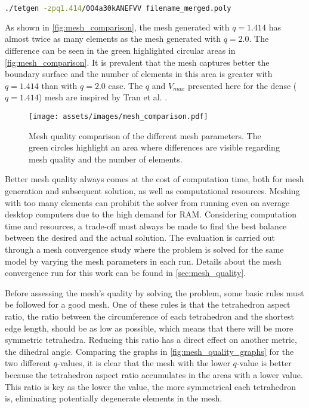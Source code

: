 \begin{lstlisting}[language=bash,caption={Command to run TetGen},captionpos=b, label=lst:tetgen_commands]
	./tetgen -zpq1.414/0O4a30kANEFVV filename_merged.poly
\end{lstlisting}

As shown in \autoref{fig:mesh_comparison}, the mesh generated with $q = 1.414$ has almost twice as many elements as the mesh generated with $q = 2.0$. The difference can be seen in the green highlighted circular areas in \autoref{fig:mesh_comparison}. It is prevalent that the mesh captures better the boundary surface and the number of elements in this area is greater with $q = 1.414$ than with $q = 2.0$ case. The $q$ and $V_{max}$ presented here for the dense ($q=1.414$) mesh are inspired by Tran et al. \cite{Tran2020}.

\begin{figure}[H]
    \centering
    \texttt{[image: assets/images/mesh\_comparison.pdf]}
    \caption[Mesh quality comparison for the different $q$ parameters.]{Mesh quality comparison of the different mesh parameters. The green circles highlight an area where differences are visible regarding mesh quality and the number of elements.}
    \label{fig:mesh_comparison}
\end{figure}

Better mesh quality always comes at the cost of computation time, both for mesh generation and subsequent solution, as well as computational resources. Meshing with too many elements can prohibit the solver from running even on average desktop computers due to the high demand for \gls{RAM}. Considering computation time and resources, a trade-off must always be made to find the best balance between the desired and the actual solution. The evaluation is carried out through a mesh convergence study where the problem is solved for the same model by varying the mesh parameters in each run. Details about the mesh convergence run for this work can be found in \ref{sec:mesh_quality}.

Before assessing the mesh's quality by solving the problem, some basic rules must be followed for a good mesh. One of these rules is that the \gls{tetrahedron aspect ratio}, the ratio between the circumference of each tetrahedron and the shortest edge length, should be as low as possible, which means that there will be more symmetric tetrahedra. Reducing this ratio has a direct effect on another metric, the dihedral angle. Comparing the graphs in \autoref{fig:mesh_quality_graphs} for the two different $q$-values, it is clear that the mesh with the lower $q$-value is better because the \gls{tetrahedron aspect ratio} accumulates in the areas with a lower value. This ratio is key as the lower the value, the more symmetrical each tetrahedron is, eliminating potentially degenerate elements in the mesh.

